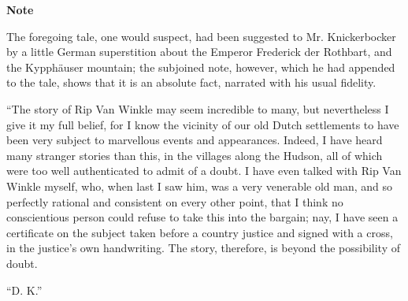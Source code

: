 \clearpage
\textbf{Note\\}

\noindent
The foregoing tale, one would suspect, had been suggested to Mr. Knickerbocker by a little German superstition about the Emperor Frederick der Rothbart, and the Kypphäuser mountain; the subjoined note, however, which he had appended to the tale, shows that it is an absolute fact, narrated with his usual fidelity.

“The story of Rip Van Winkle may seem incredible to many, but nevertheless I give it my full belief, for I know the vicinity of our old Dutch settlements to have been very subject to marvellous events and appearances. Indeed, I have heard many stranger stories than this, in the villages along the Hudson, all of which were too well authenticated to admit of a doubt. I have even talked with Rip Van Winkle myself, who, when last I saw him, was a very venerable old man, and so perfectly rational and consistent on every other point, that I think no conscientious person could refuse to take this into the bargain; nay, I have seen a certificate on the subject taken before a country justice and signed with a cross, in the justice’s own handwriting. The story, therefore, is beyond the possibility of doubt.

\begin{flushright}
	“D. K.”
\end{flushright}


